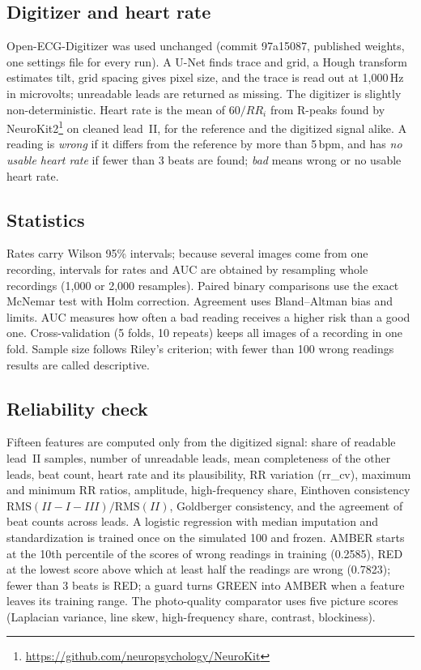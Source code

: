 \documentclass[11pt,a4paper]{article}
\newcommand{\bpm}{\,bpm}
\begin{document}
\subsection{Digitizer and heart rate}
Open-ECG-Digitizer \citep{ref5} was used unchanged (commit 97a15087, published weights, one settings file for every run). A U-Net finds trace and grid, a Hough transform estimates tilt, grid spacing gives pixel size, and the trace is read out at 1,000\,Hz in microvolts; unreadable leads are returned as missing. The digitizer is slightly non-deterministic. Heart rate is the mean of $60/RR_i$ from R-peaks found by NeuroKit2\citep{ref62}\footnote{\url{https://github.com/neuropsychology/NeuroKit}} on cleaned lead~II, for the reference and the digitized signal alike. A reading is \emph{wrong} if it differs from the reference by more than 5\bpm, and has \emph{no usable heart rate} if fewer than 3 beats are found; \emph{bad} means wrong or no usable heart rate.

\subsection{Statistics}
Rates carry Wilson 95\% intervals; because several images come from one recording, intervals for rates and AUC are obtained by resampling whole recordings (1,000 or 2,000 resamples). Paired binary comparisons use the exact McNemar test with Holm correction. Agreement uses Bland--Altman bias and limits. AUC measures how often a bad reading receives a higher risk than a good one. Cross-validation (5 folds, 10 repeats) keeps all images of a recording in one fold. Sample size follows Riley's criterion; with fewer than 100 wrong readings results are called descriptive.

\subsection{Reliability check}
Fifteen features are computed only from the digitized signal: share of readable lead~II samples, number of unreadable leads, mean completeness of the other leads, beat count, heart rate and its plausibility, RR variation (rr\_cv), maximum and minimum RR ratios, amplitude, high-frequency share, Einthoven consistency $\mathrm{RMS}(II-I-III)/\mathrm{RMS}(II)$, Goldberger consistency, and the agreement of beat counts across leads. A logistic regression with median imputation and standardization is trained once on the simulated 100 and frozen. AMBER starts at the 10th percentile of the scores of wrong readings in training (0.2585), RED at the lowest score above which at least half the readings are wrong (0.7823); fewer than 3 beats is RED; a guard turns GREEN into AMBER when a feature leaves its training range. The photo-quality comparator uses five picture scores (Laplacian variance, line skew, high-frequency share, contrast, blockiness).
\end{document}
